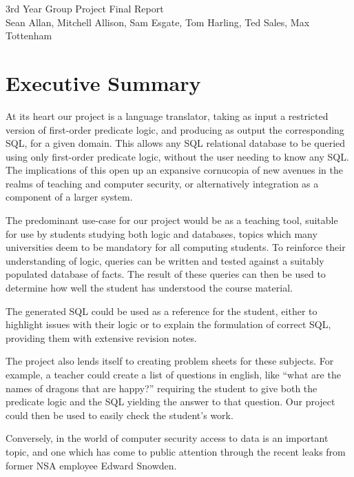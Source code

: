 \documentclass[a4paper, 11pt]{article}
\begin{document}
\begin{center}
  \huge 3rd Year Group Project Final Report \\ [0.4cm]
  \large Sean Allan, Mitchell Allison, Sam Esgate, Tom Harling, Ted Sales,
         Max Tottenham \\ [0.2cm]
  \vspace{0cm}
\end{center}

\tableofcontents
\clearpage

\section{Executive Summary}
  At its heart our project is a language translator, taking as input a
  restricted version of first-order predicate logic, and producing as output
  the corresponding SQL, for a given domain. This allows any SQL relational
  database to be queried using only first-order predicate logic, without the
  user needing to know any SQL. The implications of this open up an expansive
  cornucopia of new avenues in the realms of teaching and computer security, or
  alternatively integration as a component of a larger system.

  The predominant use-case for our project would be as a teaching tool,
  suitable for use by students studying both logic and databases, topics which
  many universities deem to be mandatory for all computing students. To
  reinforce their understanding of logic, queries can be written and tested
  against a suitably populated database of facts. The result of these queries
  can then be used to determine how well the student has understood the course
  material.

  The generated SQL could be used as a reference for the student, either to
  highlight issues with their logic or to explain the formulation of correct
  SQL, providing them with extensive revision notes.

  The project also lends itself to creating problem sheets for these subjects.
  For example, a teacher could create a list of questions in english, like
  ``what are the names of dragons that are happy?'' requiring the student to
  give both the predicate logic and the SQL yielding the answer to that
  question. Our project could then be used to easily check the student's work.


  Conversely, in the world of computer security access to data is an important
  topic, and one which has come to public attention through the recent leaks
  from former NSA employee Edward Snowden.
\end{document}
